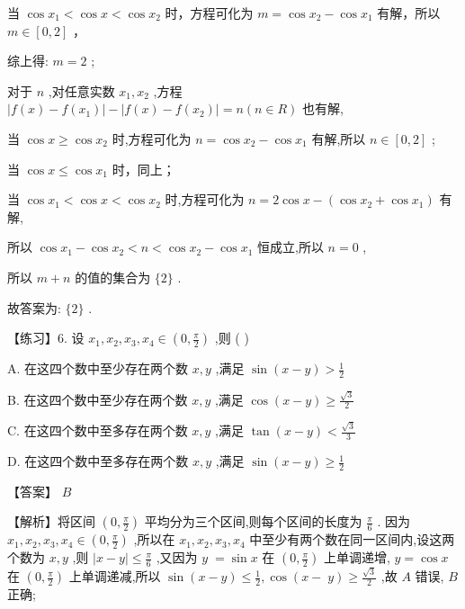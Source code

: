 \documentclass[10pt]{article}
\begin{document}
当 \(\cos {x}_{1} < \cos x < \cos {x}_{2}\) 时，方程可化为 \(m = \cos {x}_{2} - \cos {x}_{1}\) 有解，所以 \(m \in  \left\lbrack  {0,2}\right\rbrack\) ，

综上得: \(m = 2\) ;

对于 \(n\) ,对任意实数 \({x}_{1},{x}_{2}\) ,方程 \(\left| {f\left( x\right)  - f\left( {x}_{1}\right) }\right|  - \left| {f\left( x\right)  - f\left( {x}_{2}\right) }\right|  = n\left( {n \in  R}\right)\) 也有解,

当 \(\cos x \geq  \cos {x}_{2}\) 时,方程可化为 \(n = \cos {x}_{2} - \cos {x}_{1}\) 有解,所以 \(n \in  \left\lbrack  {0,2}\right\rbrack\) ;

当 \(\cos x \leq  \cos {x}_{1}\) 时，同上；

当 \(\cos {x}_{1} < \cos x < \cos {x}_{2}\) 时,方程可化为 \(n = 2\cos x - \left( {\cos {x}_{2} + \cos {x}_{1}}\right)\) 有解,

所以 \(\cos {x}_{1} - \cos {x}_{2} < n < \cos {x}_{2} - \cos {x}_{1}\) 恒成立,所以 \(n = 0\) ,

所以 \(m + n\) 的值的集合为 \(\{ 2\}\) .

故答案为: \(\{ 2\}\) .

【练习】6. 设 \({x}_{1},{x}_{2},{x}_{3},{x}_{4} \in  \left( {0,\frac{\pi }{2}}\right)\) ,则 ( )

A. 在这四个数中至少存在两个数 \(x,y\) ,满足 \(\sin \left( {x - y}\right)  > \frac{1}{2}\)

B. 在这四个数中至少存在两个数 \(x,y\) ,满足 \(\cos \left( {x - y}\right)  \geq  \frac{\sqrt{3}}{2}\)

C. 在这四个数中至多存在两个数 \(x,y\) ,满足 \(\tan \left( {x - y}\right)  < \frac{\sqrt{3}}{3}\)

D. 在这四个数中至多存在两个数 \(x,y\) ,满足 \(\sin \left( {x - y}\right)  \geq  \frac{1}{2}\)

【答案】 \(B\)

【解析】将区间 \(\left( {0,\frac{\pi }{2}}\right)\) 平均分为三个区间,则每个区间的长度为 \(\frac{\pi }{6}\) . 因为 \({x}_{1},{x}_{2},{x}_{3},{x}_{4} \in  \left( {0,\frac{\pi }{2}}\right)\) ,所以在 \({x}_{1},{x}_{2},{x}_{3},{x}_{4}\) 中至少有两个数在同一区间内,设这两个数为 \(x,y\) ,则 \(\left| {x - y}\right|  \leq  \frac{\pi }{6}\) ,又因为 \(y \; = \sin x\) 在 \(\left( {0,\frac{\pi }{2}}\right)\) 上单调递增, \(y = \cos x\) 在 \(\left( {0,\frac{\pi }{2}}\right)\) 上单调递减,所以 \(\sin \left( {x - y}\right)  \leq  \frac{1}{2},\cos (x - \; y) \geq  \frac{\sqrt{3}}{2}\) ,故 \(A\) 错误, \(B\) 正确;
\end{document}
